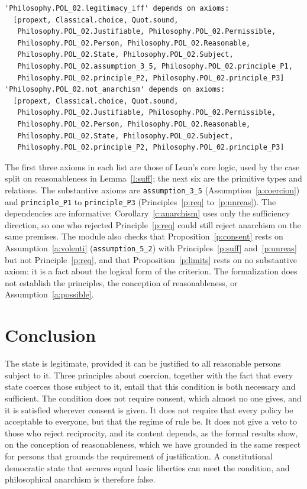\documentclass{situationist-preprint}
\begin{document}
\begin{lstlisting}
'Philosophy.POL_02.legitimacy_iff' depends on axioms:
  [propext, Classical.choice, Quot.sound,
   Philosophy.POL_02.Justifiable, Philosophy.POL_02.Permissible,
   Philosophy.POL_02.Person, Philosophy.POL_02.Reasonable,
   Philosophy.POL_02.State, Philosophy.POL_02.Subject,
   Philosophy.POL_02.assumption_3_5, Philosophy.POL_02.principle_P1,
   Philosophy.POL_02.principle_P2, Philosophy.POL_02.principle_P3]
'Philosophy.POL_02.not_anarchism' depends on axioms:
  [propext, Classical.choice, Quot.sound,
   Philosophy.POL_02.Justifiable, Philosophy.POL_02.Permissible,
   Philosophy.POL_02.Person, Philosophy.POL_02.Reasonable,
   Philosophy.POL_02.State, Philosophy.POL_02.Subject,
   Philosophy.POL_02.principle_P2, Philosophy.POL_02.principle_P3]
\end{lstlisting}

The first three axioms in each list are those of Lean's core logic, used by the case split on reasonableness in Lemma~\ref{l:suff}; the next six are the primitive types and relations. The substantive axioms are \texttt{assumption\_3\_5} (Assumption~\ref{a:coercion}) and \texttt{principle\_P1} to \texttt{principle\_P3} (Principles~\ref{p:req} to~\ref{p:unreas}). The dependencies are informative: Corollary~\ref{c:anarchism} uses only the sufficiency direction, so one who rejected Principle~\ref{p:req} could still reject anarchism on the same premises. The module also checks that Proposition~\ref{p:consent} rests on Assumption~\ref{a:volenti} (\texttt{assumption\_5\_2}) with Principles~\ref{p:suff} and~\ref{p:unreas} but not Principle~\ref{p:req}, and that Proposition~\ref{p:limits} rests on no substantive axiom: it is a fact about the logical form of the criterion. The formalization does not establish the principles, the conception of reasonableness, or Assumption~\ref{a:possible}.

\section{Conclusion}

The state is legitimate, provided it can be justified to all reasonable persons subject to it. Three principles about coercion, together with the fact that every state coerces those subject to it, entail that this condition is both necessary and sufficient. The condition does not require consent, which almost no one gives, and it is satisfied wherever consent is given. It does not require that every policy be acceptable to everyone, but that the regime of rule be. It does not give a veto to those who reject reciprocity, and its content depends, as the formal results show, on the conception of reasonableness, which we have grounded in the same respect for persons that grounds the requirement of justification. A constitutional democratic state that secures equal basic liberties can meet the condition, and philosophical anarchism is therefore false.
\end{document}
